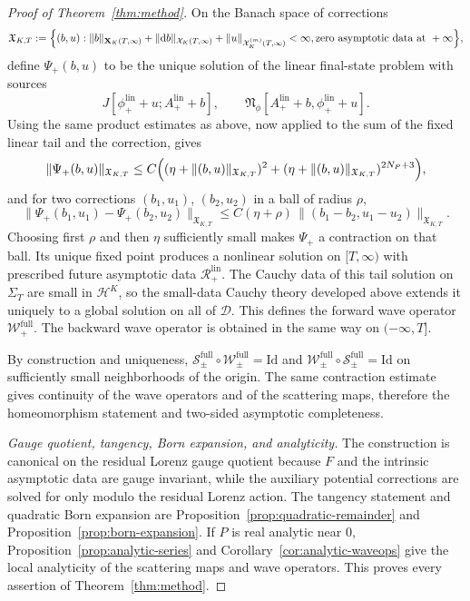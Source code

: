\documentclass[11pt]{article}
\numberwithin{equation}{section}
\theoremstyle{plain}
\theoremstyle{definition}
\theoremstyle{remark}
\newcommand{\dd}{\mathrm{d}}
\begin{document}
\begin{proof}[Proof of Theorem~\ref{thm:method}]
On the Banach space of corrections
\begin{equation}
\mathfrak X_{K,T}
:=
\Bigl\{
(b,u):
\|b\|_{\mathbf X_{K}(T,\infty)}
+\|\dd b\|_{\mathcal X_{K}(T,\infty)}
+\|u\|_{\mathcal X_{K}^{(m)}(T,\infty)}
<\infty,
\text{zero asymptotic data at }+\infty
\Bigr\},
\end{equation}
define $\Psi_{+}(b,u)$ to be the unique solution of the linear final-state problem with sources
\begin{equation}
J[\phi_{+}^{\mathrm{lin}}+u;A_{+}^{\mathrm{lin}}+b],
\qquad
\mathfrak N_{\phi}[A_{+}^{\mathrm{lin}}+b,\phi_{+}^{\mathrm{lin}}+u].
\end{equation}
Using the same product estimates as above, now applied to the sum of the fixed linear tail and the correction, gives
\begin{equation}
\|\Psi_{+}(b,u)\|_{\mathfrak X_{K,T}}
\le
C\Bigl((\eta+\|(b,u)\|_{\mathfrak X_{K,T}})^{2}
+(\eta+\|(b,u)\|_{\mathfrak X_{K,T}})^{2N_{P}+3}\Bigr),
\end{equation}
and for two corrections $(b_{1},u_{1})$, $(b_{2},u_{2})$ in a ball of radius $\rho$,
\begin{equation}
\|\Psi_{+}(b_{1},u_{1})-\Psi_{+}(b_{2},u_{2})\|_{\mathfrak X_{K,T}}
\le
C(\eta+\rho)\,
\|(b_{1}-b_{2},u_{1}-u_{2})\|_{\mathfrak X_{K,T}}.
\end{equation}
Choosing first $\rho$ and then $\eta$ sufficiently small makes $\Psi_{+}$ a contraction on that ball. Its unique fixed point produces a nonlinear solution on $[T,\infty)$ with prescribed future asymptotic data $\mathcal R_{+}^{\mathrm{lin}}$. The Cauchy data of this tail solution on $\Sigma_{T}$ are small in $\mathcal H^{K}$, so the small-data Cauchy theory developed above extends it uniquely to a global solution on all of $\mathcal D$. This defines the forward wave operator $\mathscr W_{+}^{\mathrm{full}}$. The backward wave operator is obtained in the same way on $(-\infty,T]$.

By construction and uniqueness, $\mathscr S_{\pm}^{\mathrm{full}}\circ \mathscr W_{\pm}^{\mathrm{full}}=\mathrm{Id}$ and $\mathscr W_{\pm}^{\mathrm{full}}\circ \mathscr S_{\pm}^{\mathrm{full}}=\mathrm{Id}$ on sufficiently small neighborhoods of the origin. The same contraction estimate gives continuity of the wave operators and of the scattering maps, therefore the homeomorphism statement and two-sided asymptotic completeness.

\smallskip
\noindent\emph{Gauge quotient, tangency, Born expansion, and analyticity.}
The construction is canonical on the residual Lorenz gauge quotient because $F$ and the intrinsic asymptotic data are gauge invariant, while the auxiliary potential corrections are solved for only modulo the residual Lorenz action. The tangency statement and quadratic Born expansion are Proposition~\ref{prop:quadratic-remainder} and Proposition~\ref{prop:born-expansion}. If $P$ is real analytic near $0$, Proposition~\ref{prop:analytic-series} and Corollary~\ref{cor:analytic-waveops} give the local analyticity of the scattering maps and wave operators. This proves every assertion of Theorem~\ref{thm:method}.
\end{proof}
\end{document}
